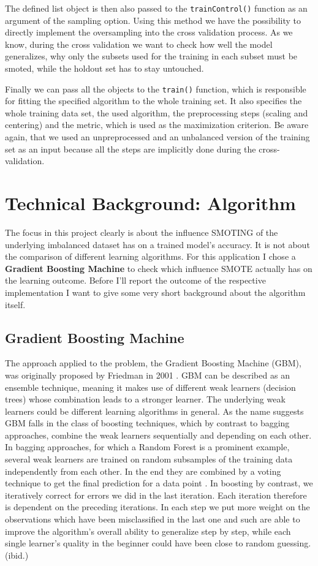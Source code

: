 \documentclass[12pt,a4paper]{article}
\begin{document}
The defined list object is then also passed to the \verb+trainControl()+ function as an argument of the sampling option. Using this method we have the possibility to directly implement the oversampling into the cross validation process. As we know, during the cross validation we want to check how well the model generalizes, why only the subsets used for the training in each subset must be smoted, while the holdout set has to stay untouched.\par
Finally we can pass all the objects to the \verb+train()+ function, which is responsible for fitting the specified algorithm to the whole training set. It also specifies the whole training data set, the used algorithm, the preprocessing steps (scaling and centering) and the metric, which is used as the maximization criterion. Be aware again, that we used an unpreprocessed and an unbalanced version of the training set as an input because all the steps are implicitly done during the cross-validation.
\section{Technical Background: Algorithm}
The focus in this project clearly is about the influence SMOTING of the underlying imbalanced dataset has on a trained model's accuracy. It is not about the comparison of different learning algorithms. For this application I chose a \textbf{Gradient Boosting Machine} to check which influence SMOTE actually has on the learning outcome. Before I'll report the outcome of the respective implementation I want to give some very short background about the algorithm itself.
\subsection{Gradient Boosting Machine}
The approach applied to the problem, the Gradient Boosting Machine (GBM), was originally proposed by Friedman in 2001 \cite{friedman2001greedy}. GBM can be described as an ensemble technique, meaning it makes use of different weak learners (decision trees) whose combination leads to a stronger learner. The underlying weak learners could be different learning algorithms in general. As the name suggests GBM falls in the class of boosting techniques, which by contrast to bagging approaches, combine the weak learners sequentially and depending on each other. In bagging approaches, for which a Random Forest is a prominent example, several weak learners are trained on random subsamples of the training data independently from each other. In the end they are combined by a voting technique to get the final prediction for a data point \cite{aggarwalClassBook}. In boosting by contrast, we iteratively correct for errors we did in the last iteration. Each iteration therefore is dependent on the preceding iterations. In each step we put more weight on the observations which have been misclassified in the last one and such are able to improve the algorithm's overall ability to generalize step by step, while each single learner's quality in the beginner could have been close to random guessing. (ibid.)
\end{document}
